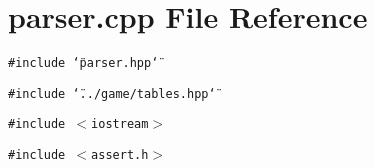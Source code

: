 \section{parser.cpp File Reference}
\label{parser_8cpp}
{\tt \#include \char`\"{}parser.hpp\char`\"{}}\par
{\tt \#include \char`\"{}../game/tables.hpp\char`\"{}}\par
{\tt \#include $<$iostream$>$}\par
{\tt \#include $<$assert.h$>$}\par
